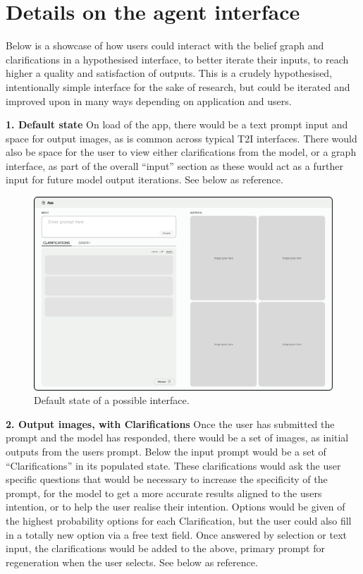 
\section{Details on the agent interface}

\label{app:interface}


Below is a showcase of how users could interact with the belief graph and clarifications in a hypothesised interface, to better iterate their inputs, to reach higher a quality and satisfaction of outputs. This is a crudely hypothesised, intentionally simple interface for the sake of research, but could be iterated and improved upon in many ways depending on application and users. 

\textbf{1. Default state}
On load of the app, there would be a text prompt input and space for output images, as is common across typical T2I interfaces. There would also be space for the user to view either clarifications from the model, or a graph interface, as part of the overall ``input'' section as these would act as a further input for future model output iterations. See  below as reference. 

\begin{figure} [ht!]
    \centering
    \includegraphics[width=.9\linewidth]{figures/Default.pdf}
    \caption{Default state of a possible interface.}
    \label{fig:interface1}
\end{figure} 

\textbf{2. Output images, with Clarifications} 
Once the user has submitted the prompt and the model has responded, there would be a set of images, as initial outputs from the users prompt. Below the input prompt would be a set of ``Clarifications'' in its populated state. These clarifications would ask the user specific questions that would be necessary to increase the specificity of the prompt, for the model to get a more accurate results aligned to the users intention, or to help the user realise their intention. Options would be given of the highest probability options for each Clarification, but the user could also fill in a totally new option via a free text field. Once answered by selection or text input, the clarifications would be added to the above, primary prompt for regeneration when the user selects. See  below as reference.

